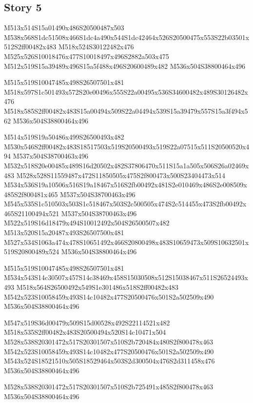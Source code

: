 \documentclass{article}
\begin{document}
\subsection{Story 5}

\begin{multicols}{5}
\begin{center}
M513x514S15a01490x486S20500487x503 %
M538x568S1dc51508x466S1dc4a490x544S1dc42464x526S20500475x553S22b03501x512S2ff00482x483 %
M518x524S30122482x476 %
M525x526S10018476x477S10018497x496S2882a503x475 %
M512x519S15a39489x496S15a5f488x496S20600489x482 %
M536x504S38800464x496 %

M515x519S10047485x498S26507501x481 %
M518x597S1c501493x572S20e00496x555S22a00495x536S34600482x489S30126482x476 %
M518x585S2ff00482x483S15a00494x509S22a04494x539S15a39479x557S15a3f494x562 %
M536x504S38800464x496 %

M514x519S19a50486x499S26500493x482 %
M530x546S2ff00482x483S18517503x519S20500493x519S22a07515x511S20500520x494 %
M537x504S38700463x496 %
M532x518S20e00485x489S16d20502x482S37806470x511S15a1a505x506S26a02469x483 %
M528x528S11559487x472S11850505x475S2f800473x500S23404473x514 %
M534x536S19a10506x516S19a18467x516S2fb00492x481S2e010469x486S2e008509x485S2f800481x465 %
M537x504S38700463x496 %
M545x535S1c510503x503S1c518467x503S2c500505x474S2c514455x473S2fb00492x465S21100494x521 %
M537x504S38700463x496 %
M522x519S16d18479x494S10012492x504S26500507x482 %
M513x520S15a20487x493S26507500x481 %
M527x534S1063a474x478S10651492x466S20800498x483S10659473x509S10632501x519S20800489x524 %
M536x504S38800464x496 %

M515x519S10047485x498S26507501x481 %
M534x543S14c30507x457S14c38469x458S15030508x512S15038467x511S26524493x493 %
M518x564S26500492x549S1e301486x518S2ff00482x483 %
M542x523S10058459x493S14c10482x477S20500476x501S2a502509x490 %
M536x504S38800464x496 %

M547x519S36d00479x509S15d00528x492S22114521x482 %
M518x535S2ff00482x483S20500494x520S14c10471x504 %
M528x538S20301472x517S20301507x510S2b720484x480S2f800478x463 %
M542x523S10058459x493S14c10482x477S20500476x501S2a502509x490 %
M543x524S18521510x505S18529464x503S2d300504x476S2d311458x476 %
M536x504S38800464x496 %

M528x538S20301472x517S20301507x510S2b725491x485S2f800478x463 %
M536x504S38800464x496 %


\end{center}
\end{multicols}
\end{document}
